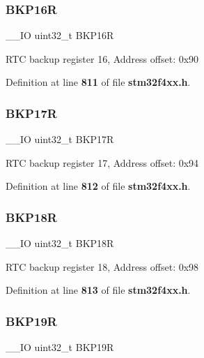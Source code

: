 \mbox{\label{structRTC__TypeDef_ad2f2eb2fb4b93e21515b10e920e719b6}} 
\subsubsection{B\+K\+P16R}
{\footnotesize\ttfamily \+\_\+\+\_\+\+IO uint32\+\_\+t B\+K\+P16R}

R\+TC backup register 16, Address offset\+: 0x90 

Definition at line \textbf{ 811} of file \textbf{ stm32f4xx.\+h}.

\mbox{\label{structRTC__TypeDef_a2842aa523df62f3508316eb3b2e08f4e}} 
\subsubsection{B\+K\+P17R}
{\footnotesize\ttfamily \+\_\+\+\_\+\+IO uint32\+\_\+t B\+K\+P17R}

R\+TC backup register 17, Address offset\+: 0x94 

Definition at line \textbf{ 812} of file \textbf{ stm32f4xx.\+h}.

\mbox{\label{structRTC__TypeDef_a640ccb2ccfb6316b88c070362dc29339}} 
\subsubsection{B\+K\+P18R}
{\footnotesize\ttfamily \+\_\+\+\_\+\+IO uint32\+\_\+t B\+K\+P18R}

R\+TC backup register 18, Address offset\+: 0x98 

Definition at line \textbf{ 813} of file \textbf{ stm32f4xx.\+h}.

\mbox{\label{structRTC__TypeDef_a4ec1dd54d976989b7c9e59fb14d974fb}} 
\subsubsection{B\+K\+P19R}
{\footnotesize\ttfamily \+\_\+\+\_\+\+IO uint32\+\_\+t B\+K\+P19R}

